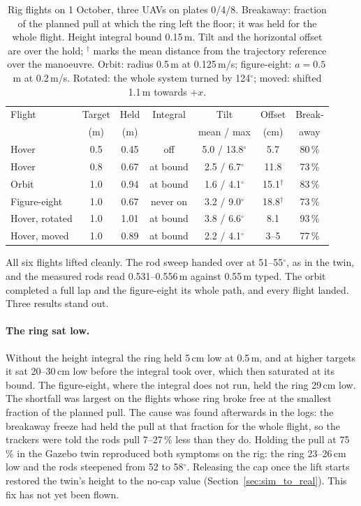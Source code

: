 \begin{table}[h]
\centering
\small
\caption{Rig flights on 1 October, three UAVs on plates 0/4/8. Breakaway: fraction of the planned
pull at which the ring left the floor; it was held for the whole flight. Height integral bound
0.15\,m. Tilt and the horizontal offset are over the hold; $^{\dagger}$ marks the mean distance from
the trajectory reference over the manoeuvre. Orbit: radius 0.5\,m at 0.125\,m/s; figure-eight:
$a = 0.5$\,m at 0.2\,m/s. Rotated: the whole system turned by 124$^\circ$; moved: shifted 1.1\,m
towards $+x$.}
\label{tab:rig_oct1}
\footnotesize
\begin{tabularx}{\textwidth}{>{\raggedright\arraybackslash}Xcccccc}
\toprule
Flight & Target & Held & Integral & Tilt & Offset & Break- \\
 & (m) & (m) & & mean / max & (cm) & away \\
\midrule
Hover & 0.5 & 0.45 & off & 5.0 / 13.8$^\circ$ & 5.7 & 80\,\% \\
Hover & 0.8 & 0.67 & at bound & 2.5 / 6.7$^\circ$ & 11.8 & 73\,\% \\
Orbit & 1.0 & 0.94 & at bound & 1.6 / 4.1$^\circ$ & 15.1$^{\dagger}$ & 83\,\% \\
Figure-eight & 1.0 & 0.67 & never on & 3.2 / 9.0$^\circ$ & 18.8$^{\dagger}$ & 73\,\% \\
Hover, rotated & 1.0 & 1.01 & at bound & 3.8 / 6.6$^\circ$ & 8.1 & 93\,\% \\
Hover, moved & 1.0 & 0.89 & at bound & 2.2 / 4.1$^\circ$ & 3--5 & 77\,\% \\
\bottomrule
\end{tabularx}
\end{table}

All six flights lifted cleanly. The rod sweep handed over at 51--55$^\circ$, as in the twin, and the
measured rods read 0.531--0.556\,m against 0.55\,m typed. The orbit completed a full lap and the
figure-eight its whole path, and every flight landed. Three results stand out.

\paragraph{The ring sat low.} Without the height integral the ring held 5\,cm low at 0.5\,m, and at
higher targets it sat 20--30\,cm low before the integral took over, which then saturated at its bound.
The figure-eight, where the integral does not run, held the ring 29\,cm low. The shortfall was largest
on the flights whose ring broke free at the smallest fraction of the planned pull. The cause was
found afterwards in the logs: the breakaway freeze had held the pull at that fraction for the whole
flight, so the trackers were told the rods pull 7--27\,\% less than they do. Holding the pull at
75\,\% in the Gazebo twin reproduced both symptoms on the rig: the ring 23--26\,cm low and the rods
steepened from 52 to 58$^\circ$. Releasing the cap once the lift starts restored the twin's height
to the no-cap value (Section~\ref{sec:sim_to_real}). This fix has not yet been flown.


